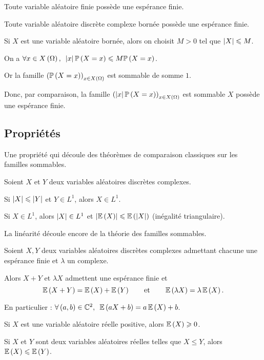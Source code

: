 \begin{prop}
Toute variable aléatoire finie possède une espérance finie.

Toute variable aléatoire discrète complexe bornée possède une espérance finie.
\end{prop}

\begin{dem}
Si \(X\) est une variable aléatoire bornée, alors on choisit \(M>0\) tel que \(\left\lvert X\right\rvert\leqslant M\).

On a \(\quantifs{\forall x\in X\paren{\Omega}}\abs{x}\proba{X=x}\leq M\proba{X=x}\).

Or la famille \(\left(\mathbb{P}\left(X=x\right)\right)_{x\in X\left(\Omega\right)}\) est sommable de somme \(1\).

Donc, par comparaison, la famille \(\left(\left\lvert x\right\rvert\mathbb{P}\left(X=x\right)\right)_{x\in X\left(\Omega\right)}\) est sommable \ie \(X\) possède une espérance finie.
\end{dem}

\subsection{Propriétés}

Une propriété qui découle des théorèmes de comparaison classiques sur les familles sommables.

\begin{prop}
Soient \(X\) et \(Y\) deux variables aléatoires discrètes complexes.

Si \(\left\lvert X\right\rvert\leqslant\left\lvert Y\right\rvert\) et \(Y\in L^1\), alors \(X\in L^1\).

Si \(X\in L^1\), alors \(\left\lvert X\right\rvert\in L^1\) et \(\left\lvert\operatorname{\mathbb{E}}\left(X\right)\right\rvert\leqslant\operatorname{\mathbb{E}}\left(\left\lvert X\right\rvert\right)\) (inégalité triangulaire).
\end{prop}

La linéarité découle encore de la théorie des familles sommables.

\begin{prop}
Soient \(X,Y\) deux variables aléatoires discrètes complexes admettant chacune une espérance finie et \(\lambda\) un complexe.

Alors \(X+Y\) et \(\lambda X\) admettent une espérance finie et \[\operatorname{\mathbb{E}}\left(X+Y\right)=\operatorname{\mathbb{E}}\left(X\right)+\operatorname{\mathbb{E}}\left(Y\right)\qquad\text{et}\qquad\operatorname{\mathbb{E}}\left(\lambda X\right)=\lambda\operatorname{\mathbb{E}}\left(X\right).\]

En particulier : \(\quantifs{\forall\paren{a,b}\in\C^2}\esp{aX+b}=a\esp{X}+b\).

Si \(X\) est une variable aléatoire réelle positive, alors \(\operatorname{\mathbb{E}}\left(X\right)\geqslant0\).

Si \(X\) et \(Y\) sont deux variables aléatoires réelles telles que \(X\leq Y\), alors \(\operatorname{\mathbb{E}}\left(X\right)\leqslant\operatorname{\mathbb{E}}\left(Y\right)\).
\end{prop}

